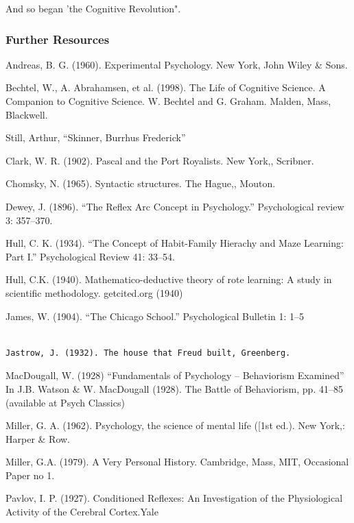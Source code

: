 And so began 'the Cognitive Revolution".

\subsubsection{Further Resources}
\label{furtherresources}

Andreas, B. G. (1960). Experimental Psychology. New York, John Wiley \& Sons.

Bechtel, W., A. Abrahamsen, et al. (1998). The Life of Cognitive Science. A Companion to Cognitive Science. W. Bechtel and G. Graham. Malden, Mass, Blackwell.

Still, Arthur, ``Skinner, Burrhus Frederick''

Clark, W. R. (1902). Pascal and the Port Royalists. New York,, Scribner.

Chomsky, N. (1965). Syntactic structures. The Hague,, Mouton.

Dewey, J. (1896). ``The Reflex Arc Concept in Psychology.'' Psychological review 3: 357--370.

Hull, C. K. (1934). ``The Concept of Habit-Family Hierachy and Maze Learning: Part I.'' Psychological Review 41: 33--54.

Hull, C.K. (1940). Mathematico-deductive theory of rote learning: A study in scientific methodology. getcited.org (1940)

James, W. (1904). ``The Chicago School.'' Psychological Bulletin 1: 1--5

\begin{adjustwidth}{2.5em}{2.5em}
\begin{verbatim}

Jastrow, J. (1932). The house that Freud built, Greenberg.

\end{verbatim}
\end{adjustwidth}

MacDougall, W. (1928) ``Fundamentals of Psychology – Behaviorism Examined'' In J.B. Watson \& W. MacDougall (1928). The Battle of Behaviorism, pp. 41--85 (available at Psych Classics)

Miller, G. A. (1962). Psychology, the science of mental life ([1st ed.). New York,: Harper \& Row.

Miller, G.A. (1979). A Very Personal History. Cambridge, Mass, MIT, Occasional Paper no 1.

Pavlov, I. P. (1927). Conditioned Reflexes: An Investigation of the Physiological Activity of the Cerebral Cortex.Yale

